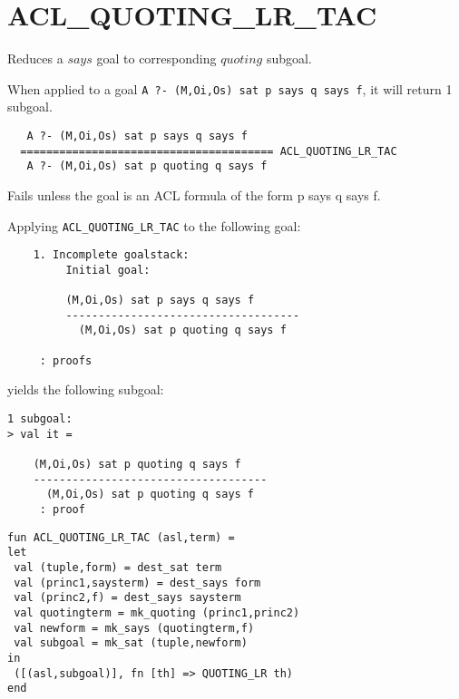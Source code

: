 \SEEALSO
\ENDDOC

\section{ACL\_QUOTING\_LR\_TAC}



\egroup


\SYNOPSIS
Reduces a $says$ goal to corresponding $quoting$ subgoal.

\DESCRIBE When applied to a goal \texttt{A ?- (M,Oi,Os) sat p says q says f}, it will return 1 subgoal.
\begin{verbatim}
   A ?- (M,Oi,Os) sat p says q says f
  ======================================= ACL_QUOTING_LR_TAC
   A ?- (M,Oi,Os) sat p quoting q says f
\end{verbatim}

\FAILURE 
Fails unless the goal is an ACL formula of the form p says q says f.

\EXAMPLE
Applying \texttt{ACL\_QUOTING\_LR\_TAC} to the following goal:
\begin{holboxed}
\begin{verbatim}
    1. Incomplete goalstack:
         Initial goal:
    
         (M,Oi,Os) sat p says q says f
         ------------------------------------
           (M,Oi,Os) sat p quoting q says f
    
     : proofs
\end{verbatim}
\end{holboxed}
yields the following subgoal:
\begin{holboxed}
\begin{verbatim}
1 subgoal:
> val it =
    
    (M,Oi,Os) sat p quoting q says f
    ------------------------------------
      (M,Oi,Os) sat p quoting q says f
     : proof
\end{verbatim}
\end{holboxed}

\IMPLEMENTATION
\begin{holboxed}
\begin{verbatim}
fun ACL_QUOTING_LR_TAC (asl,term) =
let
 val (tuple,form) = dest_sat term
 val (princ1,saysterm) = dest_says form
 val (princ2,f) = dest_says saysterm
 val quotingterm = mk_quoting (princ1,princ2)
 val newform = mk_says (quotingterm,f)
 val subgoal = mk_sat (tuple,newform)
in
 ([(asl,subgoal)], fn [th] => QUOTING_LR th)
end
\end{verbatim}
\end{holboxed}

